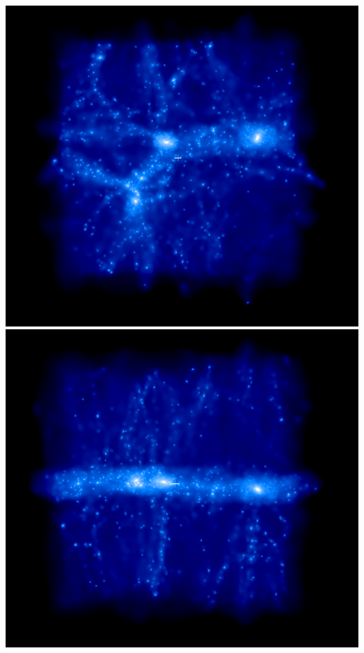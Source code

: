\includegraphics[scale=0.2]{r128/h100/drdx_h100_r128_2/1.png} 
\includegraphics[scale=0.2]{r128/h100/drdx_h100_r128_2/2.png} 

